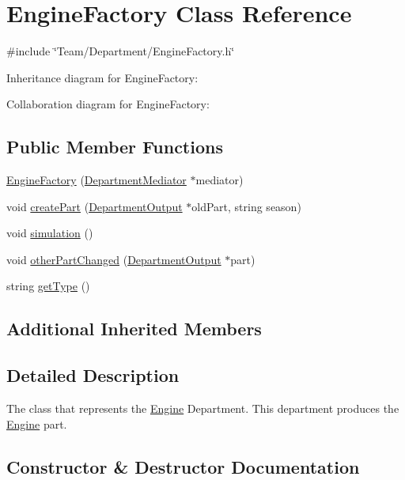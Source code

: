 \hypertarget{classEngineFactory}{}\section{Engine\+Factory Class Reference}
\label{classEngineFactory}


{\ttfamily \#include \char`\"{}Team/\+Department/\+Engine\+Factory.\+h\char`\"{}}



Inheritance diagram for Engine\+Factory\+:


Collaboration diagram for Engine\+Factory\+:
\subsection*{Public Member Functions}
\begin{DoxyCompactItemize}
\item 
\hyperlink{classEngineFactory_aa056855d16da0ce042a66042860b5ae8}{Engine\+Factory} (\hyperlink{classDepartmentMediator}{Department\+Mediator} $\ast$mediator)
\item 
void \hyperlink{classEngineFactory_af8c2f4bf420b5d2f0742b3d38746cf40}{create\+Part} (\hyperlink{classDepartmentOutput}{Department\+Output} $\ast$old\+Part, string season)
\item 
void \hyperlink{classEngineFactory_abcc2b59253cefc7f902a47b19273cf76}{simulation} ()
\item 
void \hyperlink{classEngineFactory_a12c1223834cb2d653a1c659aa1504c51}{other\+Part\+Changed} (\hyperlink{classDepartmentOutput}{Department\+Output} $\ast$part)
\item 
string \hyperlink{classEngineFactory_a52fd49ea32ab2dc62aa8c86e058fb138}{get\+Type} ()
\end{DoxyCompactItemize}
\subsection*{Additional Inherited Members}


\subsection{Detailed Description}
The class that represents the \hyperlink{classEngine}{Engine} Department. This department produces the \hyperlink{classEngine}{Engine} part. 

\subsection{Constructor \& Destructor Documentation}
\mbox{\label{classEngineFactory_aa056855d16da0ce042a66042860b5ae8}} 
